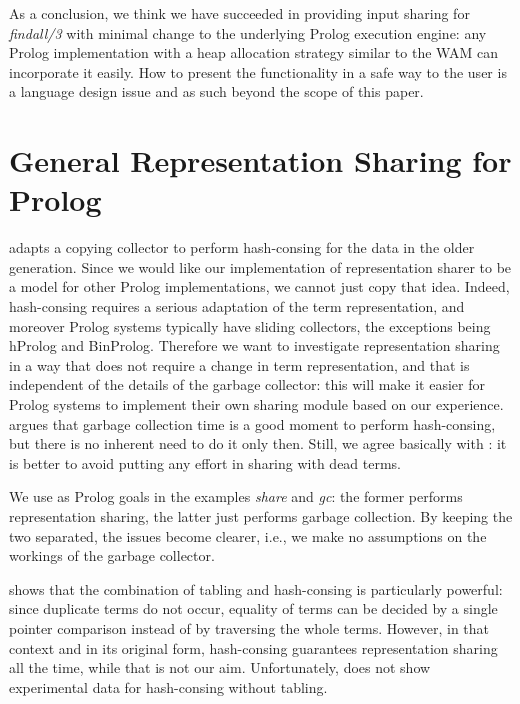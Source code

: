 \documentclass{tlp}
\begin{document}
As a conclusion, we think we have succeeded in providing input sharing
for {\em findall/3} with minimal change to the underlying Prolog execution
engine: any Prolog implementation with a heap allocation strategy
similar to the WAM can incorporate it easily. How to present the
functionality in a safe way to the user is a language design issue and
as such beyond the scope of this paper.


\section{General Representation Sharing for Prolog}\label{generalities}

\cite{appelhashconsinggc} adapts a copying collector to perform
hash-consing for the data in the older generation. Since we would like
our implementation of representation sharer to be a model for other
Prolog implementations, we cannot just copy that idea. Indeed,
hash-consing requires a serious adaptation of the term
representation, and moreover Prolog systems typically have sliding
collectors, the exceptions being hProlog and BinProlog. Therefore we
want to investigate representation sharing in a way that does not
require a change in term representation, and that is independent of
the details of the garbage collector: this will make it easier for
Prolog systems to implement their own sharing module based on our
experience. \cite{appelhashconsinggc} argues that garbage collection
time is a good moment to perform hash-consing, but there is no
inherent need to do it only then. Still, we agree basically with
\cite{appelhashconsinggc}: it is better to avoid putting any effort in
sharing with dead terms.

We use as Prolog goals in the examples {\em share} and {\em gc}: the
former performs representation sharing, the latter just performs
garbage collection. By keeping the two separated, the issues become
clearer, i.e., we make no assumptions on the workings of the garbage
collector.


\cite{bakerwarpspeed} shows that the combination of tabling and
hash-consing is particularly powerful: since duplicate terms do not
occur, equality of terms can be decided by a single pointer comparison
instead of by traversing the whole terms. However, in that context and
in its original form, hash-consing guarantees representation sharing
all the time, while that is not our aim. Unfortunately,
\cite{bakerwarpspeed} does not show experimental data for hash-consing
without tabling.
\end{document}
